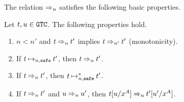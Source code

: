 The relation $\mathbin{\Rightarrow_{n}}$ satisfies the following basic properties. 
\begin{lemma}\label{lem:parallel_basic}
  Let $t, u\in {\tt GTC}$. The following properties hold. 
  \begin{enumerate}
  \item\label{lem:parallel_basic1}
    $n < n'$ and $t \mathbin{\Rightarrow_{n}} t'$ implies $t \mathbin{\Rightarrow_{n'}} t'$ (monotonicity). 
  \item\label{lem:parallel_basic2}
    If $t \mathbin{\mathbin{\mapsto}_{n,{\hbox{\scriptsize \tt safe}}}} t'$, then $t \mathbin{\Rightarrow_{n}} t'$. 
  \item\label{lem:parallel_basic3}
    If $t \mathbin{\Rightarrow_{n}} t'$, then $t \mathbin{\mathbin{\mapsto}_{n,{\hbox{\scriptsize \tt safe}}}^*} t'$.
  \item\label{lem:parallel_basic4}
    If $t \mathbin{\Rightarrow_{n}} t'$ and $u \mathbin{\Rightarrow_{n}} u'$, 
    then $t[u/x^A] \mathbin{\Rightarrow_{n}} t'[u'/x^A]$.
  \end{enumerate}
\end{lemma}
